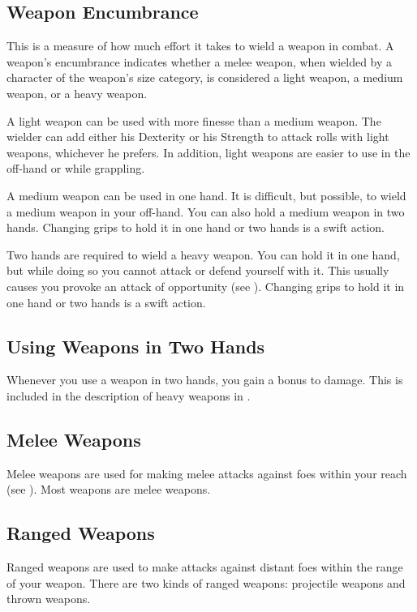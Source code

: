\subsection{Weapon Encumbrance}
This is a measure of how much effort it takes to wield a weapon in combat. A weapon's encumbrance indicates whether a melee weapon, when wielded by a character of the weapon's size category, is considered a light weapon, a medium weapon, or a heavy weapon.

 A light weapon can be used with more finesse than a medium weapon. The wielder can add either his Dexterity or his Strength to attack rolls with light weapons, whichever he prefers. In addition, light weapons are easier to use in the off-hand or while grappling.

 A medium weapon can be used in one hand. It is difficult, but possible, to wield a medium weapon in your off-hand. You can also hold a medium weapon in two hands. Changing grips to hold it in one hand or two hands is a swift action. 

 Two hands are required to wield a heavy weapon. You can hold it in one hand, but while doing so you cannot attack or defend yourself with it. This usually causes you provoke an attack of opportunity (see ). Changing grips to hold it in one hand or two hands is a swift action.

\subsection{Using Weapons in Two Hands}
Whenever you use a weapon in two hands, you gain a  bonus to damage. This is included in the description of heavy weapons in .

\subsection{Melee Weapons}
Melee weapons are used for making melee attacks against foes within your reach (see ). Most weapons are melee weapons.

\subsection{Ranged Weapons}
Ranged weapons are used to make attacks against distant foes within the range of your weapon. There are two kinds of ranged weapons: projectile weapons and thrown weapons.


